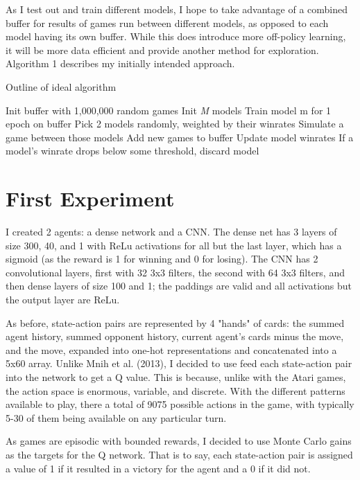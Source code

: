 \documentclass{article}
\begin{document}
As I test out and train different models, I hope to take advantage of a combined buffer for results of games run between different models, as opposed to each model having its own buffer. While this does introduce more off-policy learning, it will be more data efficient and provide another method for exploration. Algorithm 1 describes my initially intended approach.

\begin{algorithm}[tb]
   \caption{Outline of ideal algorithm}
\begin{algorithmic}
   \STATE Init buffer with 1,000,000 random games
   \STATE Init \textit{M} models
   \REPEAT
   \STATE Train model m for 1 epoch on buffer
   \ENDFOR
   \STATE Pick 2 models randomly, weighted by their winrates
   \STATE Simulate a game between those models
   \ENDFOR
   \STATE Add new games to buffer
   \STATE Update model winrates
   \STATE If a model's winrate drops below some threshold, discard model
\end{algorithmic}
\end{algorithm}

\section{First Experiment}

I created 2 agents: a dense network and a CNN. The dense net has 3 layers of size 300, 40, and 1 with ReLu activations for all but the last layer, which has a sigmoid (as the reward is 1 for winning and 0 for losing). The CNN has 2 convolutional layers, first with 32 3x3 filters, the second with 64 3x3 filters, and then dense layers of size 100 and 1; the paddings are valid and all activations but the output layer are ReLu.

As before, state-action pairs are represented by 4 "hands" of cards: the summed agent history, summed opponent history, current agent's cards minus the move, and the move, expanded into one-hot representations and concatenated into a 5x60 array. Unlike Mnih et al. (2013), I decided to use feed each state-action pair into the network to get a Q value. This is because, unlike with the Atari games, the action space is enormous, variable, and discrete. With the different patterns available to play, there a total of 9075 possible actions in the game, with typically 5-30 of them being available on any particular turn. 

As games are episodic with bounded rewards, I decided to use Monte Carlo gains as the targets for the Q network. That is to say, each state-action pair is assigned a value of 1 if it resulted in a victory for the agent and a 0 if it did not.
\end{document}
